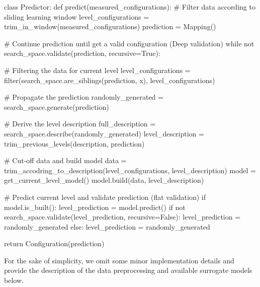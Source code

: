 \begin{code}[language=Python, caption=P.F.R.1 + P.F.R.3 implementation pseudo-code., label=impl: P.F.R.1 + P.F.R.3 implementation pseudocode]
class Predictor:
	def predict(measured_configurations):
		# Filter data according to sliding learning window
		level_configurations = trim_in_window(measured_configurations)
		prediction = Mapping()
		
		# Continue prediction until get a valid configuration (Deep validation)
		while not search_space.validate(prediction, recursive=True):
		
			# Filtering the data for current level
			level_configurations = filter(search_space.are_siblings(prediction, x), level_configurations)
			
			# Propagate the prediction
			randomly_generated = search_space.generate(prediction)
			
			# Derive the level description
			full_description = search_space.describe(randomly_generated)
			level_description = trim_previous_levels(description, prediction)
			
			# Cut-off data and build model
			data = trim_accodring_to_description(level_configurations, level_description)
			model = get_current_level_model()
			model.build(data, level_description)
			
			# Predict current level and validate prediction (flat validation)
			if model.is_built():
				level_prediction = model.predict()
				if not search_space.validate(level_prediction, recursive=False):
					level_prediction = randomly_generated
			else:
				level_prediction = randomly_generated
		
		return Configuration(prediction)
\end{code}

For the sake of simplicity, we omit some minor implementation details and provide the description of the data preprocessing and available surrogate models below.

